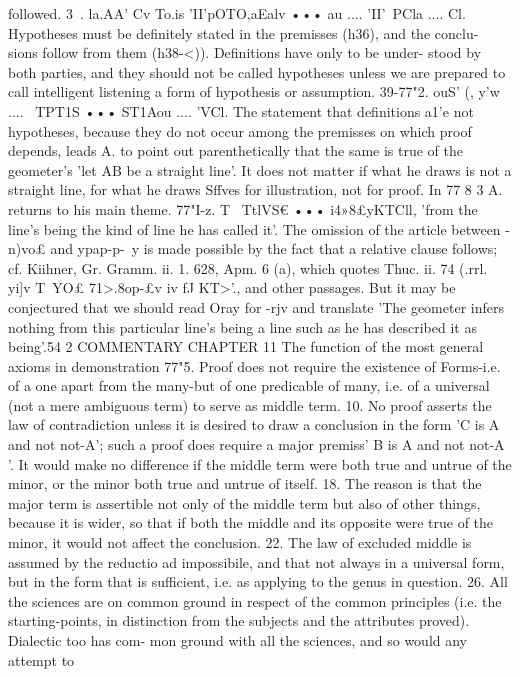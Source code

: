 {{{{{{{{{{{{followed.
3~. la.AA' Cv To.is 'II'pOTO,aEalv ••• au .... 'II'~PCla .... Cl. Hypotheses
must be definitely stated in the premisses (h36), and the conclu-
sions follow from them (h38-<)). Definitions have only to be under-
stood by both parties, and they should not be called hypotheses
unless we are prepared to call intelligent listening a form of
hypothesis or assumption.
39-77"2. ouS' (, y'w .... ~TPT1S ••• ST1Aou .... 'VCl. The statement that
definitions a1'e not hypotheses, because they do not occur among
the premisses on which proof depends, leads A. to point out
parenthetically that the same is true of the geometer's 'let AB be
a straight line'. It does not matter if what he draws is not a
straight line, for what he draws Sffves for illustration, not for
proof. In 77 8 3 A. returns to his main theme.
77"I-z. T~ TtlVS€ ••• i4»8£yKTCll, 'from the line's being the kind
of line he has called it'. The omission of the article between -n)vo£
and ypap-p-~y is made possible by the fact that a relative clause
follows; cf. Kiihner, Gr. Gramm. ii. 1. 628, Apm. 6 (a), which
quotes Thuc. ii. 74 (.rrl. yi]v T~YO£ 71>.8op-£v iv fJ KT>'., and other
passages. But it may be conjectured that we should read Oray
for -rjv and translate 'The geometer infers nothing from this
particular line's being a line such as he has described it as being'.54 2
COMMENTARY
CHAPTER 11
The function of the most general axioms in demonstration
77"5. Proof does not require the existence of Forms-i.e. of
a one apart from the many-but of one predicable of many, i.e.
of a universal (not a mere ambiguous term) to serve as middle
term.
10. No proof asserts the law of contradiction unless it is
desired to draw a conclusion in the form 'C is A and not not-A';
such a proof does require a major premiss' B is A and not not-A '.
It would make no difference if the middle term were both true
and untrue of the minor, or the minor both true and untrue of
itself.
18. The reason is that the major term is assertible not only
of the middle term but also of other things, because it is wider,
so that if both the middle and its opposite were true of the minor,
it would not affect the conclusion.
22. The law of excluded middle is assumed by the reductio ad
impossibile, and that not always in a universal form, but in the
form that is sufficient, i.e. as applying to the genus in question.
26. All the sciences are on common ground in respect of the
common principles (i.e. the starting-points, in distinction from
the subjects and the attributes proved). Dialectic too has com-
mon ground with all the sciences, and so would any attempt to
}}}}}}}}}}}}
